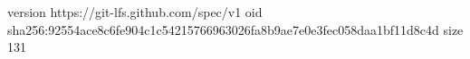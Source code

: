 version https://git-lfs.github.com/spec/v1
oid sha256:92554ace8c6fe904c1c54215766963026fa8b9ae7e0e3fec058daa1bf11d8c4d
size 131
